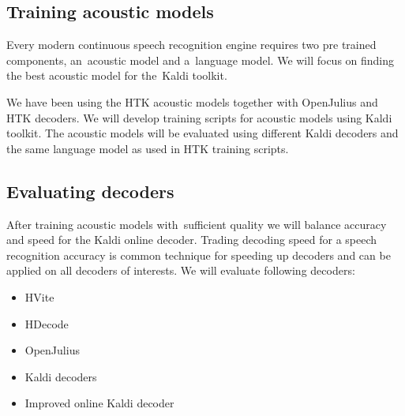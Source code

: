 


% 
% 

\subsection{Training acoustic models} 
\label{sub:training_kaldi_acoustic_models}
Every modern continuous speech recognition engine requires two pre trained components, an~acoustic model and a~language model. We will focus on finding the best acoustic model for the~Kaldi toolkit. 

We have been using the \ac{HTK} acoustic models together with OpenJulius and \ac{HTK} decoders. We will develop training scripts for acoustic models using Kaldi toolkit. The acoustic models will be evaluated using different Kaldi decoders and the same language model as used in \ac{HTK} training scripts. 

 

\subsection{Evaluating decoders} 
\label{sub:compare_rt}
After training acoustic models with~sufficient quality we will balance accuracy and speed for the Kaldi online decoder. Trading decoding speed for a speech recognition accuracy is common technique for speeding up decoders and can be applied on all decoders of interests. We will evaluate following decoders:
\begin{itemize}
    \item HVite  %
    \item HDecode %
    \item OpenJulius %
    \item Kaldi decoders
    \item Improved online Kaldi decoder
\end{itemize}

